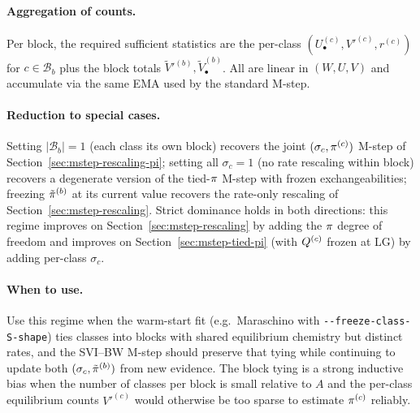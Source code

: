\paragraph{Aggregation of counts.}
Per block, the required sufficient statistics are the per-class
$(U^{(c)}_\bullet, V'^{(c)}, r^{(c)})$ for $c \in \mathcal{B}_b$ plus
the block totals $\tilde V'^{(b)}, \tilde V_\bullet^{(b)}$.  All are
linear in $(W, U, V)$ and accumulate via the same EMA used by the
standard M-step.

\paragraph{Reduction to special cases.}
Setting $|\mathcal{B}_b| = 1$ (each class its own block) recovers
the joint $(\sigma_c, \pi^{(c)})$ M-step of
Section~\ref{sec:mstep-rescaling-pi}; setting all $\sigma_c = 1$
(no rate rescaling within block) recovers a degenerate version of
the tied-$\pi$ M-step with frozen exchangeabilities; freezing
$\tilde{\pi}^{(b)}$ at its current value recovers the rate-only
rescaling of Section~\ref{sec:mstep-rescaling}.  Strict dominance
holds in both directions: this regime improves on
Section~\ref{sec:mstep-rescaling} by adding the $\pi$ degree of
freedom and improves on Section~\ref{sec:mstep-tied-pi} (with
$Q^{(c)}$ frozen at LG) by adding per-class $\sigma_c$.

\paragraph{When to use.}
Use this regime when the warm-start fit (e.g.\ Maraschino with
\verb|--freeze-class-S-shape|) ties classes into blocks with shared
equilibrium chemistry but distinct rates, and the SVI--BW M-step
should preserve that tying while continuing to update both
$(\sigma_c, \tilde{\pi}^{(b)})$ from new evidence.  The block tying
is a strong inductive bias when the number of classes per block is
small relative to $A$ and the per-class equilibrium counts
$V'^{(c)}$ would otherwise be too sparse to estimate
$\pi^{(c)}$ reliably.

